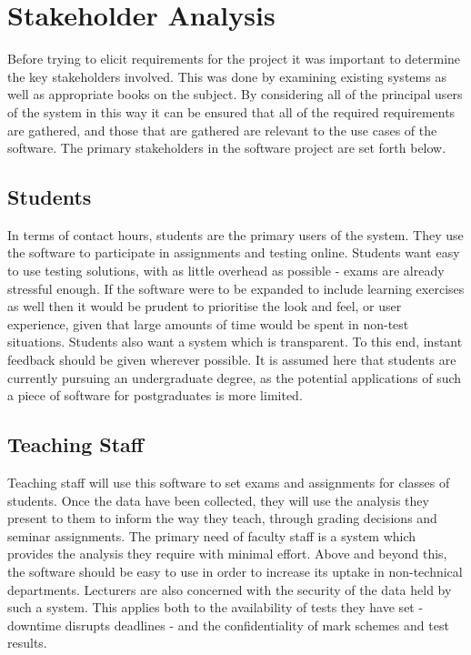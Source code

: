 \documentclass[12pt,a4paper,twoside]{report}
\begin{document}
\section{Stakeholder Analysis}
Before trying to elicit requirements for the project it was important to determine the key stakeholders involved. This was done by examining existing systems as well as appropriate books on the subject. By considering all of the principal users of the system in this way it can be ensured that all of the required requirements are gathered, and those that are gathered are relevant to the use cases of the software. The primary stakeholders in the software project are set forth below.

\subsection{Students}
In terms of contact hours, students are the primary users of the system. They use the software to participate in assignments and testing online. Students want easy to use testing solutions, with as little overhead as possible - exams are already stressful enough. If the software were to be expanded to include learning exercises as well then it would be prudent to prioritise the look and feel, or user experience, given that large amounts of time would be spent in non-test situations. Students also want a system which is transparent. To this end, instant feedback should be given wherever possible. It is assumed here that students are currently pursuing an undergraduate degree, as the potential applications of such a piece of software for postgraduates is more limited.

\subsection{Teaching Staff}
Teaching staff will use this software to set exams and assignments for classes of students. Once the data have been collected, they will use the analysis they present to them to inform the way they teach, through grading decisions and seminar assignments. The primary need of faculty staff is a system which provides the analysis they require with minimal effort. Above and beyond this, the software should be easy to use in order to increase its uptake in non-technical departments. Lecturers are also concerned with the security of the data held by such a system. This applies both to the availability of tests they have set - downtime disrupts deadlines - and the confidentiality of mark schemes and test results.
\end{document}
